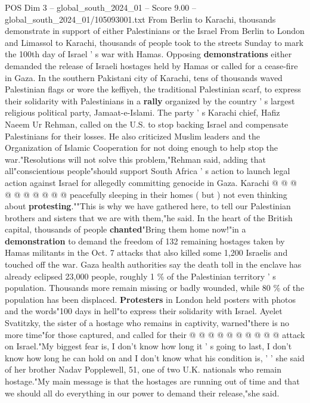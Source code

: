 \begin{textsample}{POS Dim 3 – global\_south\_2024\_01 – Score 9.00 – global\_south\_2024\_01/105093001.txt}  \label{ex:f3_pos_378}
From Berlin to Karachi, thousands demonstrate in support of either Palestinians or the Israel From Berlin to London and Limassol to Karachi, thousands of people took to the streets Sunday to mark the 100th day of Israel ' s war with Hamas.
Opposing \textbf{demonstrations} either demanded the release of Israeli hostages held by Hamas or called for a cease-fire in Gaza.
In the southern Pakistani city of Karachi, tens of thousands waved Palestinian flags or wore the keffiyeh, the traditional Palestinian scarf, to express their solidarity with Palestinians in a \textbf{rally} organized by the country ' s largest religious political party, Jamaat-e-Islami.
The party ' s Karachi chief, Hafiz Naeem Ur Rehman, called on the U.S. to stop backing Israel and compensate Palestinians for their losses.
He also criticized Muslim leaders and the Organization of Islamic Cooperation for not doing enough to help stop the war."Resolutions will not solve this problem,"Rehman said, adding that all"conscientious people"should support South Africa ' s action to launch legal action against Israel for allegedly committing genocide in Gaza.
Karachi @ @ @ @ @ @ @ @ @ @ peacefully sleeping in their homes ( but ) not even thinking about \textbf{protesting}.""This is why we have gathered here, to tell our Palestinian brothers and sisters that we are with them,"he said.
In the heart of the British capital, thousands of people \textbf{chanted}"Bring them home now!"in a \textbf{demonstration} to demand the freedom of 132 remaining hostages taken by Hamas militants in the Oct. 7 attacks that also killed some 1,200 Israelis and touched off the war.
Gaza health authorities say the death toll in the enclave has already eclipsed 23,000 people, roughly 1 \% of the Palestinian territory ' s population.
Thousands more remain missing or badly wounded, while 80 \% of the population has been displaced. \textbf{Protesters} in London held posters with photos and the words"100 days in hell"to express their solidarity with Israel.
Ayelet Svatitzky, the sister of a hostage who remains in captivity, warned"there is no more time"for those captured, and called for their @ @ @ @ @ @ @ @ @ @ attack on Israel."My biggest fear is, I don't know how long it ' s going to last, I don't know how long he can hold on and I don't know what his condition is, ' ' she said of her brother Nadav Popplewell, 51, one of two U.K. nationals who remain hostage."My main message is that the hostages are running out of time and that we should all do everything in our power to demand their release,"she said.

\end{textsample}
